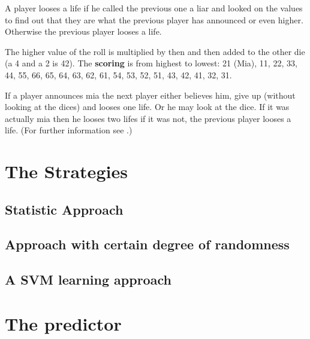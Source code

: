 \documentclass[11pt]{article}
\begin{document}
A player looses a life if he called the previous one a liar and looked on the values to find out that they are what the previous player has announced or even higher. Otherwise the previous player looses a life. 

The higher value of the roll is multiplied by then and then added to the other die (a 4 and a 2 is 42). 
The \textbf{scoring} is from highest to lowest:  21 (Mia), 11, 22, 33, 44, 55, 66, 65, 64, 63, 62, 61, 54, 53, 52, 51, 43, 42, 41, 32, 31.

If a player announces mia the next player either believes him, give up (without looking at the dices) and looses one life. Or he may look at the dice. If it was actually mia then he looses two lifes if it was not, the previous player looses a life. (For further information see \cite{mia:2016}.)
\section{The Strategies}

\subsection{Statistic Approach}
\subsection{Approach with certain degree of randomness}
\subsection{A SVM learning approach}

\section{The predictor}
\end{document}
